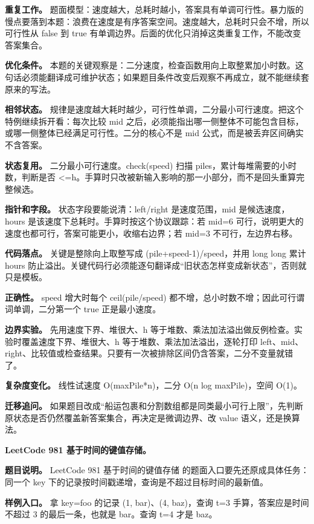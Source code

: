 \textbf{重复工作。} 题面模型：速度越大，总耗时越小，答案具有单调可行性。暴力版的慢点要落到本题：浪费在速度是有序答案空间。速度越大，总耗时只会不增，所以可行性从 false 到 true 有单调边界。后面的优化只消掉这类重复工作，不能改变答案集合。

\textbf{优化条件。} 本题的关键观察是：二分速度，检查函数用向上取整累加小时数。这句话必须能翻译成可维护状态；如果题目条件改变后观察不再成立，就不能继续套原来的写法。

\textbf{相邻状态。} 规律是速度越大耗时越少，可行性单调，二分最小可行速度。把这个特例继续拆开看：每次比较 mid 之后，必须能指出哪一侧整体不可能包含目标，或哪一侧整体已经满足可行性。二分的核心不是 mid 公式，而是被丢弃区间确实不含答案。

\textbf{状态复用。} 二分最小可行速度。check(speed) 扫描 piles，累计每堆需要的小时数，判断是否 <=h。手算时只改被新输入影响的那一小部分，而不是回头重算完整候选。

\textbf{指针和字段。} 状态字段要能说清：left/right 是速度范围，mid 是候选速度，hours 是该速度下总耗时。手算时按这个协议跟踪：若 mid=6 可行，说明更大的速度也都可行，答案可能更小，收缩右边界；若 mid=3 不可行，左边界右移。

\textbf{代码落点。} 关键是整除向上取整写成 (pile+speed-1)/speed，并用 long long 累计 hours 防止溢出。关键代码行必须能逐句翻译成“旧状态怎样变成新状态”，否则就只是模板。

\textbf{正确性。} speed 增大时每个 ceil(pile/speed) 都不增，总小时数不增；因此可行谓词单调，二分第一个 true 正是最小速度。

\textbf{边界实验。} 先用速度下界、堆很大、h 等于堆数、乘法加法溢出做反例检查。实验时覆盖速度下界、堆很大、h 等于堆数、乘法加法溢出，逐轮打印 left、mid、right、比较值或检查结果。只要有一次被排除区间仍含答案，二分不变量就错了。

\textbf{复杂度变化。} 线性试速度 O(maxPile*n)，二分 O(n log maxPile)，空间 O(1)。

\textbf{迁移追问。} 如果题目改成“船运包裹和分割数组都是同类最小可行上限”，先判断原状态是否仍然覆盖新答案集合，再决定是微调边界、改 value 语义，还是换算法。

\noindent\textbf{LeetCode 981 基于时间的键值存储。}

\textbf{题目说明。} LeetCode 981 基于时间的键值存储 的题面入口要先还原成具体任务：同一个 key 下的记录按时间戳递增，查询是不超过目标时间的最新值。

\textbf{样例入口。} 拿 key=foo 的记录 (1, bar)、(4, baz)，查询 t=3 手算，答案应是时间不超过 3 的最后一条，也就是 bar。查询 t=4 才是 baz。

